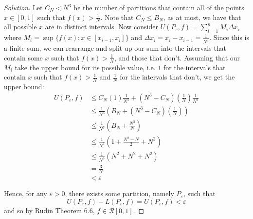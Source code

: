 \documentclass{article}
\newcommand{\ep}{{\varepsilon}}
\begin{document}
\begin{proof}[Solution]
	Let $C_N < N^3$ be the number of partitions that contain all of the
	points $x \in [0,1]$ such that $f(x) > \frac{1}{N}$.
	Note that $C_N \leq B_N$, as at most, we have that all possible
	$x$ are in distinct intervals.
	Now consider $U(P_{\ep},f) = \sum_{i=1}^n M_i \Delta x_i$ where
	$M_i = \sup\{f(x) \colon x \in [x_{i-1},x_i]\}$ and
	$\Delta x_i = x_{i} - x_{i-1} = \frac{1}{N^3}$.
	Since this is a finite sum, we can rearrange and split up our
	sum into the intervals that contain some $x$ such that $f(x) > \frac{1}{N}$,
	and those that don't.
	Assuming that our $M_i$ take the upper bound for its possible value,
	i.e. $1$ for the intervals that contain $x$ such that $f(x) > \frac{1}{N}$
	and $\frac{1}{N}$ for the intervals that don't,
	we get the upper bound:
	\begin{align*}
		U(P_{\ep},f) &\leq C_N(1)\frac{1}{N^3} +
		(N^3-C_N)\left(\frac{1}{N}\right)\frac{1}{N^3}\\
		&\leq \frac{1}{N^3}\left(B_N + (N^3-C_N)\left(\frac{1}{N}\right)\right)\\
		&\leq \frac{1}{N^3}\left(B_N + \frac{N^3}{N}\right)\\
		&\leq \frac{1}{N^3}\left(1 + \frac{N^2-N}{2} + N^2\right)\\
		&\leq \frac{1}{N^3}\left(N^2 + N^2 + N^2\right)\\
		&= \frac{3}{N}\\
		&< \ep
	\end{align*}

	Hence, for any $\ep > 0$, there exists some partition,
	namely $P_\ep$, such that
	\[
		U(P_\ep,f) - L(P_\ep,f) = U(P_\ep,f) < \ep
	\]
	and so by Rudin Theorem 6.6, $f \in \mathcal{R}[0,1]$.
\end{proof}
\end{document}
